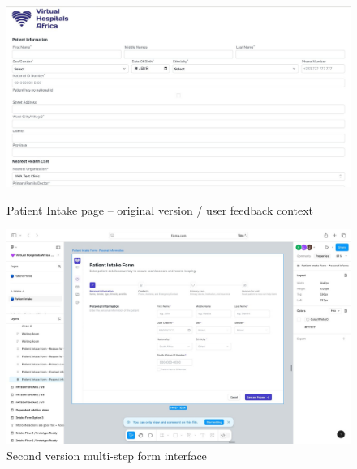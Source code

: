 \begin{figure}[H]
    \centering
    \begin{minipage}{0.47\textwidth}
        \centering
        \includegraphics[width=\textwidth]{images/(VHA)-1.jpg}
        \caption{Patient Intake page – original version / user feedback context}
        \label{fig:design-1}
    \end{minipage}\hfill
    \begin{minipage}{0.47\textwidth}
        \centering
        \includegraphics[width=\textwidth]{images/(VHA)-2.jpg}
        \caption{Second version multi-step form interface}
        \label{fig:design-2}
    \end{minipage}
\end{figure}
